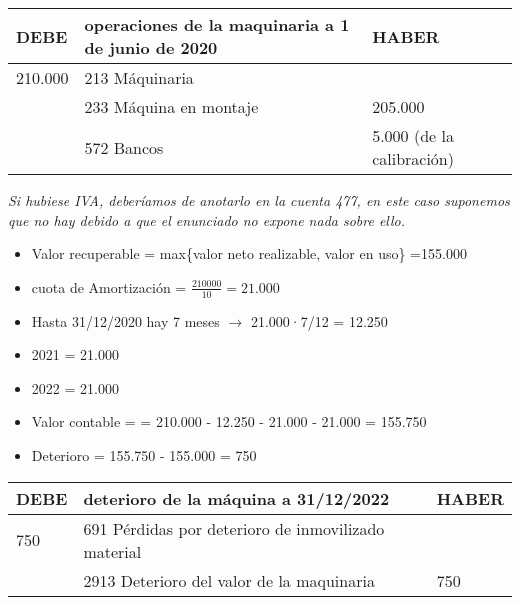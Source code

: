 \documentclass[a4paper,12pt]{article}
\newcommand{\fec}{31/12/}
\newcommand{\valorrecuperable}{Valor recuperable = max\{valor neto realizable, valor en uso\} =}
\newcommand{\PDI}{691 Pérdidas por deterioro de inmovilizado material}
\newcommand{\DVM}{2913 Deterioro del valor de la maquinaria }
\newcommand{\VC}{Valor contable = }
\begin{document}
\begin{table}[H]
    \centering
    \begin{tabular}{|p{3cm}|p{6cm}|p{3cm}|}
    \hline
    \textbf{DEBE} & \textbf{operaciones de la maquinaria a 1 de junio de 2020} & \textbf{HABER} \\
    \hline
    210.000& 213 Máquinaria& \\
    \hline
    & 233 Máquina en montaje& 205.000\\
    \hline
    & 572 Bancos& 5.000 (de la calibración)\\
    \hline
    \end{tabular}
\end{table}

\begin{tcolorbox}[colback=red!5!white, colframe=yellow!75!black, title=NOTA]  
    \textit{Si hubiese IVA, deberíamos de anotarlo en la cuenta 477, en este caso suponemos que no hay debido a que el enunciado no expone nada sobre ello.}
    
\end{tcolorbox}

\begin{itemize}
    \item \valorrecuperable 155.000
    \item cuota de Amortización = $\frac{210000}{10} = 21.000$
    \item Hasta \fec2020 hay 7 meses $\rightarrow $ 21.000·7/12 = 12.250
    \item 2021 = 21.000
    \item 2022 = 21.000
    \item \VC = 210.000 - 12.250 - 21.000 - 21.000 = 155.750
    \item Deterioro = 155.750 - 155.000 = 750
\end{itemize}
\begin{table}[H]
    \centering
    \begin{tabular}{|p{3cm}|p{6cm}|p{3cm}|}
    \hline
    \textbf{DEBE} & \textbf{deterioro de la máquina a \fec2022} & \textbf{HABER} \\
    \hline
    750& \PDI& \\
    \hline
    & \DVM & 750\\
    \hline
    \end{tabular}
\end{table}
\end{document}
